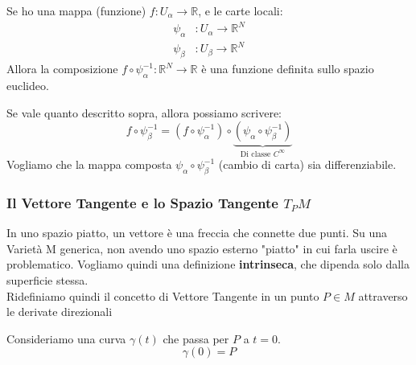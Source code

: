 \documentclass[openany]{book}
\theoremstyle{definition}
\theoremstyle{remark}
\begin{document}
\begin{itemize}
Se ho una mappa (funzione) $f: U_\alpha \to \mathbb{R}$, e le carte locali:
\begin{align*}
    \psi_\alpha &: U_\alpha \to \mathbb{R}^N \\
    \psi_\beta &: U_\beta \to \mathbb{R}^N
\end{align*}
Allora la composizione $f \circ \psi_\alpha^{-1} : \mathbb{R}^N \to \mathbb{R}$ è una funzione definita sullo spazio euclideo.

Se vale quanto descritto sopra, allora possiamo scrivere:
\[
f \circ \psi_\beta^{-1} = \left( f \circ \psi_\alpha^{-1} \right) \circ \underbrace{\left( \psi_\alpha \circ \psi_\beta^{-1} \right)}_{\text{Di classe } C^\infty}
\]
Vogliamo che la mappa composta $\psi_\alpha \circ \psi_\beta^{-1}$ (cambio di carta) sia differenziabile.



\end{itemize}

\subsubsection*{Il Vettore Tangente e lo Spazio Tangente $T_P M$}

In uno spazio piatto, un vettore è una freccia che connette due punti. Su una Varietà M generica, non avendo uno spazio esterno "piatto" in cui farla uscire è problematico.
Vogliamo quindi una definizione    \textbf{intrinseca}, che dipenda solo dalla superficie stessa.
\\
Ridefiniamo quindi il concetto di Vettore Tangente in un punto  $P \in M$ attraverso le derivate
direzionali
\begin{center}
\end{center}
Consideriamo una curva $\gamma(t)$ che passa per $P$ a $t=0$.
\[ \gamma(0) = P \]
\end{document}
